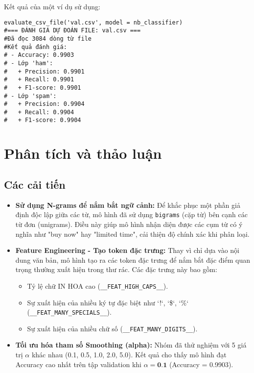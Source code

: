 Kết quả của một ví dụ sử dụng:
\begin{verbatim}
evaluate_csv_file('val.csv', model = nb_classifier)
#=== ĐÁNH GIÁ DỰ ĐOÁN FILE: val.csv ===
#Đã đọc 3084 dòng từ file
#Kết quả đánh giá:
# - Accuracy: 0.9903
# - Lớp 'ham':
#   + Precision: 0.9901
#   + Recall: 0.9901
#   + F1-score: 0.9901
# - Lớp 'spam':
#   + Precision: 0.9904
#   + Recall: 0.9904
#   + F1-score: 0.9904
\end{verbatim}

\section{Phân tích và thảo luận}

\subsection{Các cải tiến}
\begin{itemize}
    \item \textbf{Sử dụng N-grams để nắm bắt ngữ cảnh:} Để khắc phục một phần giả định độc lập giữa các từ, mô hình đã sử dụng \texttt{bigrams} (cặp từ) bên cạnh các từ đơn (unigrams). Điều này giúp mô hình nhận diện được các cụm từ có ý nghĩa như "buy now" hay "limited time", cải thiện độ chính xác khi phân loại.

    \item \textbf{Feature Engineering - Tạo token đặc trưng:} Thay vì chỉ dựa vào nội dung văn bản, mô hình tạo ra các token đặc trưng để nắm bắt đặc điểm quan trọng thường xuất hiện trong thư rác. Các đặc trưng này bao gồm:
    \begin{itemize}
        \item Tỷ lệ chữ IN HOA cao (\texttt{\_\_FEAT\_HIGH\_CAPS\_\_}).
        \item Sự xuất hiện của nhiều ký tự đặc biệt như `!`, `\$`, `\%` (\texttt{\_\_FEAT\_MANY\_SPECIALS\_\_}).
        \item Sự xuất hiện của nhiều chữ số (\texttt{\_\_FEAT\_MANY\_DIGITS\_\_}).
    \end{itemize}
    \item \textbf{Tối ưu hóa tham số Smoothing (alpha):} Nhóm đã thử nghiệm với 5 giá trị $\alpha$ khác nhau (0.1, 0.5, 1.0, 2.0, 5.0). Kết quả cho thấy mô hình đạt Accuracy cao nhất trên tập validation khi $\alpha = \textbf{0.1}$ (Accuracy = 0.9903).
\end{itemize}

